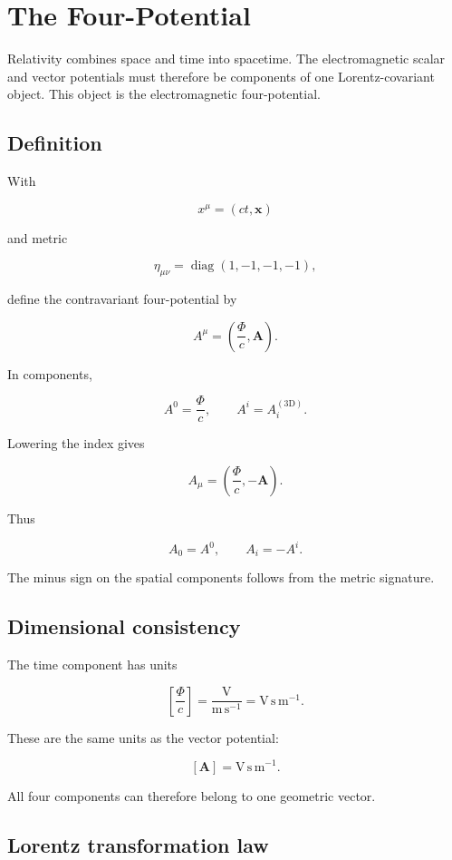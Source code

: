 \section{The Four-Potential}
\label{sec:four_potential}

Relativity combines space and time into spacetime. The electromagnetic scalar and vector potentials must therefore be components of one Lorentz-covariant object. This object is the electromagnetic four-potential.

\subsection{Definition}

With

\[
x^{\mu}
=
(ct,\mathbf{x})
\]

and metric

\[
\eta_{\mu\nu}
=
\operatorname{diag}(1,-1,-1,-1),
\]

define the contravariant four-potential by

\[
\boxed{
A^{\mu}
=
\left(
\frac{\Phi}{c},
\mathbf{A}
\right)
}.
\]

In components,

\[
A^{0}
=
\frac{\Phi}{c},
\qquad
A^{i}=A_i^{\mathrm{(3D)}}.
\]

Lowering the index gives

\[
\boxed{
A_{\mu}
=
\left(
\frac{\Phi}{c},
-\mathbf{A}
\right)
}.
\]

Thus

\[
A_0=A^0,
\qquad
A_i=-A^i.
\]

The minus sign on the spatial components follows from the metric signature.

\subsection{Dimensional consistency}

The time component has units

\[
\left[
\frac{\Phi}{c}
\right]
=
\frac{\mathrm{V}}{\mathrm{m\,s^{-1}}}
=
\mathrm{V\,s\,m^{-1}}.
\]

These are the same units as the vector potential:

\[
[\mathbf{A}]
=
\mathrm{V\,s\,m^{-1}}.
\]

All four components can therefore belong to one geometric vector.

\subsection{Lorentz transformation law}

